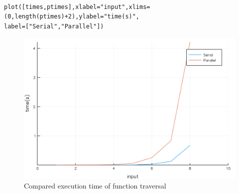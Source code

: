 \documentclass[a4paper,12pt]{article}
\begin{document}
\newpage

\noindent {}
\begin{Verbatim}[fontsize=\footnotesize]

plot([times,ptimes],xlabel="input",xlims=(0,length(ptimes)+2),ylabel="time(s)",
label=["Serial","Parallel"])

\end{Verbatim}

\begin{figure}[!h]
\centering
\includegraphics[scale=0.08]{traversalC.png}
\caption{Compared execution time of function traversal}
\end{figure}
\end{document}
